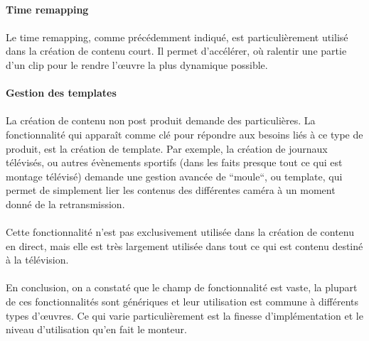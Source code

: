 \paragraph{Time remapping}
\paragraph{ }
Le time remapping, comme précédemment indiqué, est particulièrement utilisé dans
la création de contenu court. Il permet d'accélérer, où ralentir une partie d'un
clip pour le rendre l'œuvre la plus dynamique possible.

\paragraph{Gestion des templates}
\paragraph{ }
La création de contenu non post produit demande des particulières. La fonctionnalité
qui apparaît comme clé pour répondre aux besoins liés à ce type de produit, est la
création de template. Par exemple, la création de journaux télévisés, ou autres évènements
sportifs (dans les faits presque tout ce qui est montage télévisé) demande une gestion avancée de ``moule``,
ou template, qui permet de simplement lier les contenus des différentes caméra
à un moment donné de la retransmission.

\paragraph{ }
Cette fonctionnalité n'est pas exclusivement utilisée dans la création de contenu en direct, mais
elle est très largement utilisée dans tout ce qui est contenu destiné à la télévision.

\paragraph{}
\paragraph{}
En conclusion, on a constaté que le champ de fonctionnalité est vaste, la plupart de ces
fonctionnalités sont génériques et leur
utilisation est commune à différents types d'œuvres. Ce qui varie particulièrement  est
la finesse d'implémentation et le niveau d'utilisation qu'en fait le monteur.

\newpage
